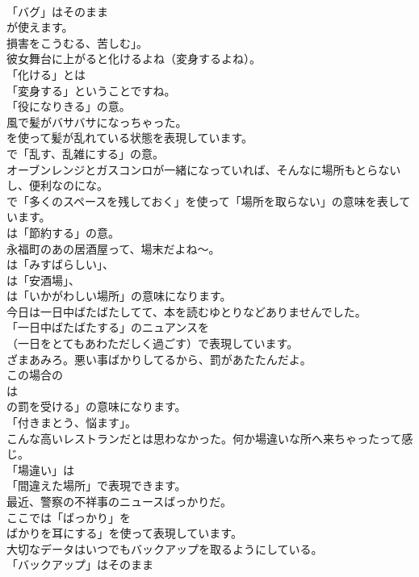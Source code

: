 \documentclass[8pt]{extreport}
\begin{document}
\begin{CJK}{UTF8}{min}
\\	「バグ」はそのまま
\\	が使えます。
\\	損害をこうむる、苦しむ」。	
\\	彼女舞台に上がると化けるよね（変身するよね）。 
\\	「化ける」とは
\\	「変身する」ということですね。
\\	「役になりきる」の意。	
\\	風で髪がバサバサになっちゃった。 
\\	を使って髪が乱れている状態を表現しています。
\\	で「乱す、乱雑にする」の意。	
\\	オーブンレンジとガスコンロが一緒になっていれば、そんなに場所もとらないし、便利なのにな。 
\\	で「多くのスペースを残しておく」を使って「場所を取らない」の意味を表しています。
\\	は「節約する」の意。	
\\	永福町のあの居酒屋って、場末だよね～。 
\\	は「みすばらしい」、
\\	は「安酒場」、
\\	は「いかがわしい場所」の意味になります。	
\\	今日は一日中ばたばたしてて、本を読むゆとりなどありませんでした。 
\\	「一日中ばたばたする」のニュアンスを 
\\	（一日をとてもあわただしく過ごす）で表現しています。	
\\	ざまあみろ。悪い事ばかりしてるから、罰があたたんだよ。 
\\	この場合の
\\	は
\\	の罰を受ける」の意味になります。
\\	「付きまとう、悩ます」。	
\\	こんな高いレストランだとは思わなかった。何か場違いな所へ来ちゃったって感じ。 
\\	「場違い」は
\\	「間違えた場所」で表現できます。	
\\	最近、警察の不祥事のニュースばっかりだ。 
\\	ここでは「ばっかり」を
\\	ばかりを耳にする」を使って表現しています。	
\\	大切なデータはいつでもバックアップを取るようにしている。 
\\	「バックアップ」はそのまま

\end{CJK}
\end{document}
